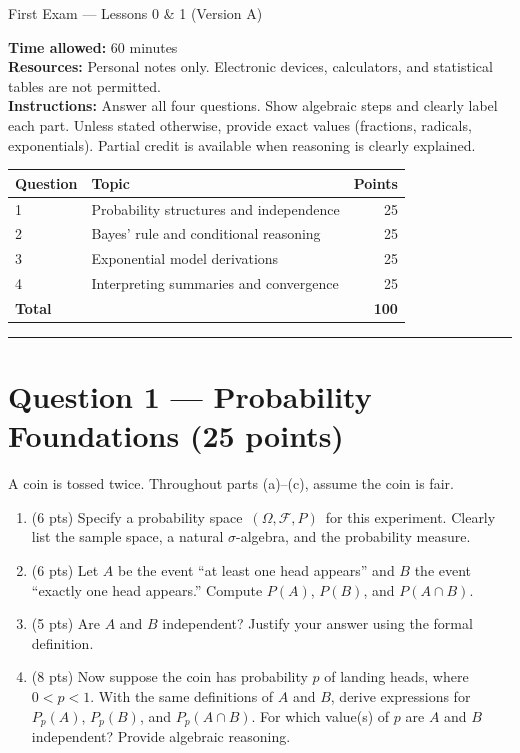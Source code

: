 \documentclass[11pt]{article}
\begin{document}
\begin{center}
{\LARGE First Exam — Lessons 0 \& 1 (Version A)}\\[0.75em]
\end{center}

\noindent\textbf{Time allowed:} 60 minutes\\
\textbf{Resources:} Personal notes only. Electronic devices, calculators, and statistical tables are not permitted.\\
\textbf{Instructions:} Answer all four questions. Show algebraic steps and clearly label each part. Unless stated otherwise, provide exact values (fractions, radicals, exponentials). Partial credit is available when reasoning is clearly explained.

\vspace{0.75em}
\noindent\begin{tabular}{@{}p{2.2cm}p{8.2cm}r@{}}
\toprule
\textbf{Question} & \textbf{Topic} & \textbf{Points}\\
\midrule
1 & Probability structures and independence & 25\\
2 & Bayes' rule and conditional reasoning & 25\\
3 & Exponential model derivations & 25\\
4 & Interpreting summaries and convergence & 25\\
\midrule
\textbf{Total} & & \textbf{100}\\
\bottomrule
\end{tabular}

\vspace{1em}
\hrule
\vspace{1em}

\section*{Question 1 — Probability Foundations (25 points)}

A coin is tossed twice. Throughout parts (a)–(c), assume the coin is fair.

\begin{enumerate}
  \item (6 pts) Specify a probability space $\,(\Omega, \mathcal{F}, P)\,$ for this experiment. Clearly list the sample space, a natural $\sigma$-algebra, and the probability measure.
  \item (6 pts) Let $A$ be the event ``at least one head appears'' and $B$ the event ``exactly one head appears.'' Compute $P(A)$, $P(B)$, and $P(A \cap B)$.
  \item (5 pts) Are $A$ and $B$ independent? Justify your answer using the formal definition.
  \item (8 pts) Now suppose the coin has probability $p$ of landing heads, where $0 < p < 1$. With the same definitions of $A$ and $B$, derive expressions for $P_p(A)$, $P_p(B)$, and $P_p(A \cap B)$. For which value(s) of $p$ are $A$ and $B$ independent? Provide algebraic reasoning.
\end{enumerate}
\end{document}
